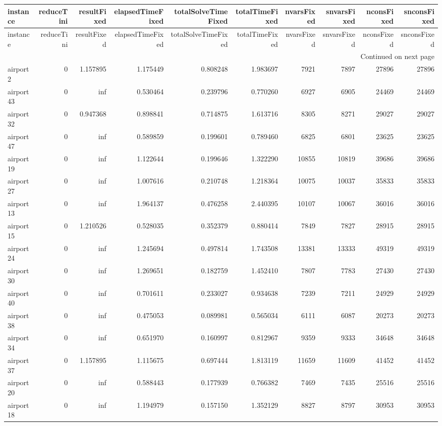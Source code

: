 \begin{longtable}{|l|r|r|r|r|r|r|r|r|r|}
\toprule
instance & reduceTini & resultFixed & elapsedTimeFixed & totalSolveTimeFixed & totalTimeFixed & nvarsFixed & snvarsFixed & nconsFixed & snconsFixed \\
\midrule
\endfirsthead
\toprule
instance & reduceTini & resultFixed & elapsedTimeFixed & totalSolveTimeFixed & totalTimeFixed & nvarsFixed & snvarsFixed & nconsFixed & snconsFixed \\
\midrule
\endhead
\midrule
\multicolumn{10}{r}{Continued on next page} \\
\midrule
\endfoot
\bottomrule
\endlastfoot
airport2 & 0 & 1.157895 & 1.175449 & 0.808248 & 1.983697 & 7921 & 7897 & 27896 & 27896 \\
airport43 & 0 & inf & 0.530464 & 0.239796 & 0.770260 & 6927 & 6905 & 24469 & 24469 \\
airport32 & 0 & 0.947368 & 0.898841 & 0.714875 & 1.613716 & 8305 & 8271 & 29027 & 29027 \\
airport47 & 0 & inf & 0.589859 & 0.199601 & 0.789460 & 6825 & 6801 & 23625 & 23625 \\
airport19 & 0 & inf & 1.122644 & 0.199646 & 1.322290 & 10855 & 10819 & 39686 & 39686 \\
airport27 & 0 & inf & 1.007616 & 0.210748 & 1.218364 & 10075 & 10037 & 35833 & 35833 \\
airport13 & 0 & inf & 1.964137 & 0.476258 & 2.440395 & 10107 & 10067 & 36016 & 36016 \\
airport15 & 0 & 1.210526 & 0.528035 & 0.352379 & 0.880414 & 7849 & 7827 & 28915 & 28915 \\
airport24 & 0 & inf & 1.245694 & 0.497814 & 1.743508 & 13381 & 13333 & 49319 & 49319 \\
airport30 & 0 & inf & 1.269651 & 0.182759 & 1.452410 & 7807 & 7783 & 27430 & 27430 \\
airport40 & 0 & inf & 0.701611 & 0.233027 & 0.934638 & 7239 & 7211 & 24929 & 24929 \\
airport38 & 0 & inf & 0.475053 & 0.089981 & 0.565034 & 6111 & 6087 & 20273 & 20273 \\
airport34 & 0 & inf & 0.651970 & 0.160997 & 0.812967 & 9359 & 9333 & 34648 & 34648 \\
airport37 & 0 & 1.157895 & 1.115675 & 0.697444 & 1.813119 & 11659 & 11609 & 41452 & 41452 \\
airport20 & 0 & inf & 0.588443 & 0.177939 & 0.766382 & 7469 & 7435 & 25516 & 25516 \\
airport18 & 0 & inf & 1.194979 & 0.157150 & 1.352129 & 8827 & 8797 & 30953 & 30953 \\

\end{longtable}
